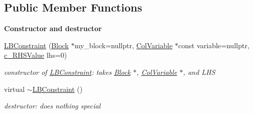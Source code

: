 \subsection*{Public Member Functions}
\begin{Indent}\textbf{ Constructor and destructor}\par
\begin{DoxyCompactItemize}
\item 
\mbox{\hyperlink{class_s_m_spp__di__unipi__it_1_1_l_b_constraint_afbe5719b3cca0e8aac8257a75a2d8ead}{L\+B\+Constraint}} (\mbox{\hyperlink{class_s_m_spp__di__unipi__it_1_1_block}{Block}} $\ast$my\+\_\+block=nullptr, \mbox{\hyperlink{class_s_m_spp__di__unipi__it_1_1_col_variable}{Col\+Variable}} $\ast$const variable=nullptr, \mbox{\hyperlink{class_s_m_spp__di__unipi__it_1_1_row_constraint_a34abd4b01d3a2024be5f6d13dd88779f}{c\+\_\+\+R\+H\+S\+Value}} lhs=0)
\begin{DoxyCompactList}\small\item\em constructor of \mbox{\hyperlink{class_s_m_spp__di__unipi__it_1_1_l_b_constraint}{L\+B\+Constraint}}\+: takes \mbox{\hyperlink{class_s_m_spp__di__unipi__it_1_1_block}{Block}} $\ast$, \mbox{\hyperlink{class_s_m_spp__di__unipi__it_1_1_col_variable}{Col\+Variable}} $\ast$, and L\+HS \end{DoxyCompactList}\item 
\mbox{\label{class_s_m_spp__di__unipi__it_1_1_l_b_constraint_ac4587c1198c623a6c1e806a237f104d3}} 
virtual \mbox{\hyperlink{class_s_m_spp__di__unipi__it_1_1_l_b_constraint_ac4587c1198c623a6c1e806a237f104d3}{$\sim$\+L\+B\+Constraint}} ()
\begin{DoxyCompactList}\small\item\em destructor\+: does nothing special \end{DoxyCompactList}\end{DoxyCompactItemize}
\end{Indent}
